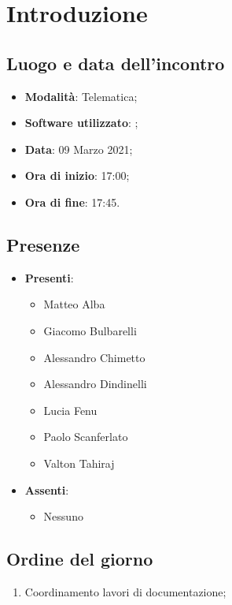 \documentclass[]{article}
\begin{document}
	

	\newpage


		\section{Introduzione}
		\subsection{Luogo e data dell'incontro}
		\begin{itemize}
			\item \textbf{Modalità}: Telematica;
			\item \textbf{Software utilizzato}: ;
			\item \textbf{Data}: 09 Marzo 2021;
			\item \textbf{Ora di inizio}: 17:00;
			\item \textbf{Ora di fine}: 17:45.
		\end{itemize}

		\subsection{Presenze}
		\begin{itemize}
			\item \textbf{Presenti}:
			\begin{itemize}
				\item Matteo Alba
				\item Giacomo Bulbarelli
				\item Alessandro Chimetto
				\item Alessandro Dindinelli
				\item Lucia Fenu
				\item Paolo Scanferlato
				\item Valton Tahiraj
			\end{itemize}
			\item \textbf{Assenti}:
			\begin{itemize}
				\item Nessuno
			\end{itemize}
		\end{itemize}


		\subsection{Ordine del giorno}
		\begin{enumerate}
			\item Coordinamento lavori di documentazione;
		\end{enumerate}
\end{document}
